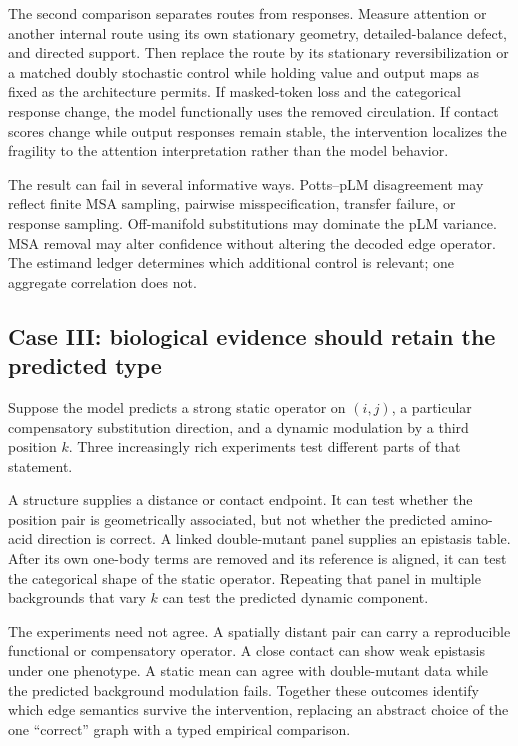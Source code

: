 The second comparison separates routes from responses.  Measure attention or another internal
route using its own stationary geometry, detailed-balance defect, and directed support.  Then
replace the route by its stationary reversibilization or a matched doubly stochastic control while
holding value and output maps as fixed as the architecture permits.  If masked-token loss and the
categorical response change, the model functionally uses the removed circulation.  If contact
scores change while output responses remain stable, the intervention localizes the fragility to
the attention interpretation rather than the model behavior.

The result can fail in several informative ways.  Potts--pLM disagreement may reflect finite MSA
sampling, pairwise misspecification, transfer failure, or response sampling.  Off-manifold
substitutions may dominate the pLM variance.  MSA removal may alter confidence without altering the
decoded edge operator.  The estimand ledger determines which additional control is relevant; one
aggregate correlation does not.

\subsection*{Case III: biological evidence should retain the predicted type}

Suppose the model predicts a strong static operator on $(i,j)$, a particular compensatory
substitution direction, and a dynamic modulation by a third position $k$.  Three increasingly rich
experiments test different parts of that statement.

A structure supplies a distance or contact endpoint.  It can test whether the position pair is
geometrically associated, but not whether the predicted amino-acid direction is correct.  A linked
double-mutant panel supplies an epistasis table.  After its own one-body terms are removed and its
reference is aligned, it can test the categorical shape of the static operator.  Repeating that
panel in multiple backgrounds that vary $k$ can test the predicted dynamic component.

The experiments need not agree.  A spatially distant pair can carry a reproducible functional or
compensatory operator.  A close contact can show weak epistasis under one phenotype.  A static mean
can agree with double-mutant data while the predicted background modulation fails.  Together these
outcomes identify which edge semantics survive the intervention, replacing an abstract choice of
the one ``correct'' graph with a typed empirical comparison.


